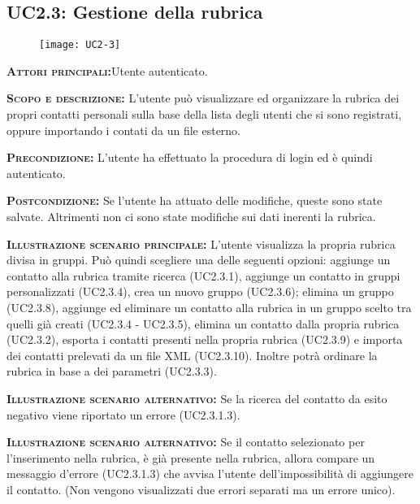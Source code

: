 \subsection{UC2.3: Gestione della rubrica}
\begin{figure}[H]
\begin{center}
\texttt{[image: UC2-3]}
\caption{}\label{fig:}
\end{center}
\end{figure}
\begin{description}
\item{\scshape\bfseries Attori principali:}Utente autenticato.
\item{\scshape\bfseries Scopo e descrizione:} L'utente può visualizzare ed organizzare la rubrica dei propri contatti personali sulla base della lista degli utenti che si sono registrati, oppure importando i contati da un file esterno.
\item{\scshape\bfseries Precondizione:} L'utente ha effettuato la procedura di login ed è quindi autenticato.
\item{\scshape\bfseries Postcondizione:} Se l'utente ha attuato delle modifiche, queste sono state salvate. Altrimenti non ci sono state modifiche sui dati inerenti la rubrica.
\item{\scshape\bfseries Illustrazione scenario principale:} L'utente visualizza la propria rubrica divisa in gruppi. Può quindi scegliere una delle seguenti opzioni: aggiunge un contatto alla rubrica tramite ricerca (UC2.3.1), aggiunge un contatto in gruppi personalizzati (UC2.3.4), crea un nuovo gruppo (UC2.3.6); elimina un gruppo (UC2.3.8), aggiunge ed eliminare un contatto alla rubrica in un gruppo scelto tra quelli già creati (UC2.3.4 - UC2.3.5), elimina un contatto dalla propria rubrica (UC2.3.2), esporta i contatti presenti nella propria rubrica (UC2.3.9) e importa dei contatti prelevati da un file XML (UC2.3.10).
Inoltre potrà ordinare la rubrica in base a dei parametri (UC2.3.3).
\item{\scshape\bfseries Illustrazione scenario alternativo:} Se la ricerca del contatto da esito negativo viene riportato un errore (UC2.3.1.3).
\item{\scshape\bfseries Illustrazione scenario alternativo:} Se il contatto selezionato per l'inserimento nella rubrica, è già presente nella rubrica, allora compare un messaggio d'errore (UC2.3.1.3) che avvisa l'utente dell'impossibilità di aggiungere il contatto. (Non vengono visualizzati due errori separati ma un errore unico).
\end{description}

